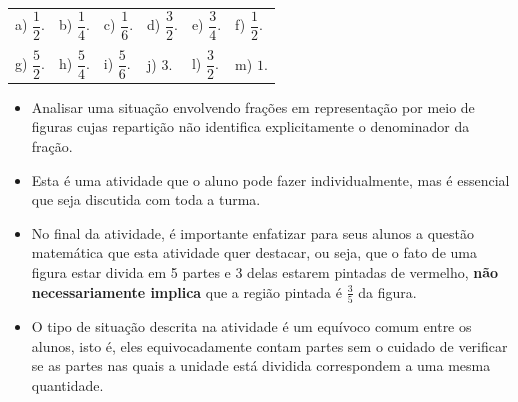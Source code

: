 \begin{solucao}{}{}  

\noindent\begin{tabular}{m{}m{}m{}m{}m{}m{}}
  a) $\dfrac{1}{2}$. &  b) $\dfrac{1}{4}$. & c) $\dfrac{1}{6}$. & d) $\dfrac{3}{2}$. &  e) $\dfrac{3}{4}$. &  f) $\dfrac{1}{2}$.   \\
\\
g) $\dfrac{5}{2}$. &  h) $\dfrac{5}{4}$. & i) $\dfrac{5}{6}$. & j) $3$.
    &  l) $\dfrac{3}{2}$. &  m) $1$.
\end{tabular} %

\end{solucao}

\newpage

\begin{multicols}{2}

  \begin{objetivos}{}{}
  \begin{itemize} %
    \item       Analisar uma situação envolvendo frações em representação por meio de figuras cujas repartição não identifica explicitamente o denominador da fração.
\end{itemize} %
\end{objetivos}

\begin{orientacoes}
\begin{itemize} %
    \item       Esta é uma atividade que o aluno pode fazer individualmente, mas é essencial que seja discutida com toda a turma.
    \item       No final da atividade, é importante enfatizar para seus alunos a questão matemática que esta atividade quer destacar, ou seja, que o fato de uma figura estar divida em 5 partes e 3 delas estarem pintadas de vermelho,       {\bf não necessariamente implica}       que a região pintada é       $\frac{3}{5}$ da figura.
    \item       O tipo de situação descrita na atividade é um equívoco comum entre os alunos, isto é, eles equivocadamente contam partes sem o cuidado de verificar se as partes nas quais a unidade está dividida correspondem a uma mesma quantidade.
\end{itemize} %



\end{orientacoes}
\end{multicols}
